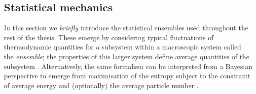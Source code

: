 \subsection{Statistical mechanics}
\label{sec:stat-mech}

In this section we \emph{briefly} introduce the statistical ensembles used throughout the rest of the thesis.
These emerge by considering typical fluctuations of thermodynamic quantities for a subsystem within a macroscopic system called the \emph{ensemble}; the properties of this larger system define average quantities of the subsystem \cite{Landau2008}.
Alternatively, the same formalism can be interpreted from a Bayesian perspective to emerge from maximisation of the entropy%
subject to the constraint of average energy and (optionally) the average particle number \cite{JaynesPR1957,JaynesPR1957a}.

